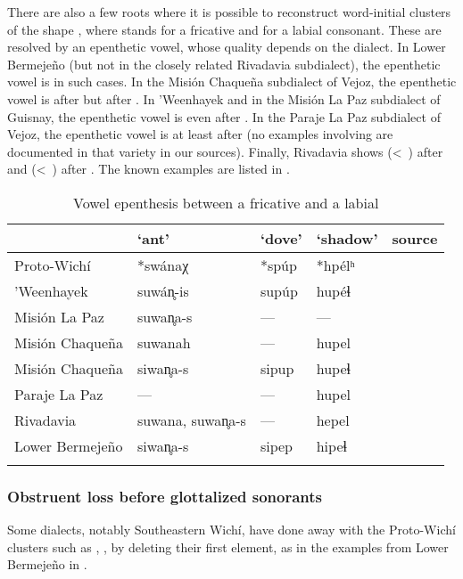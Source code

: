 There are also a few roots where it is possible to reconstruct word-initial clusters of the shape , where  stands for a fricative and  for a labial consonant. These are resolved by an epenthetic vowel, whose quality depends on the dialect. In Lower Bermejeño (but not in the closely related Rivadavia subdialect), the epenthetic vowel is  in such cases. In the Misión Chaqueña subdialect of Vejoz, the epenthetic vowel is  \recind {} after  but  after . In ’Weenhayek and in the Misión La Paz subdialect of Guisnay, the epenthetic vowel is  even after . In the Paraje La Paz subdialect of Vejoz, the epenthetic vowel is  at least after  (no examples involving  are documented in that variety in our sources). Finally, Rivadavia shows  (<~) after  and  (<~) after . The known examples are listed in .

\begin{table}
\caption{Vowel epenthesis between a fricative and a labial}
\label{wi-ep-lab}
 \begin{tabularx}{\textwidth}{llllQ}
  \lsptoprule
            & `ant' & `dove' & `shadow' & source\\\midrule
  Proto-Wichí & *swánaχ & *spúp & *hpélʰ & \\
  ’Weenhayek & suwán̥-is & supúp & hupéɬ & \citet{KC16}\\
  Misión La Paz & suwan̥a-s & — & — & \citet{MA08}\\
  Misión Chaqueña & suwanah & — & hupel & \citet{VU74}\\
  Misión Chaqueña & siwan̥a-s & sipup & hupeɬ & \citet{MG-MELO15}\\
  Paraje La Paz & — & — & hupel & \citet{AFG067}\\
  Rivadavia & suwana, suwan̥a-s & — & hepel & \citet{JT09-th}\\
  Lower Bermejeño & siwan̥a-s & sipep & hipeɬ & \citet{VN14,CS-FL-PR-VN13}\\
  \lspbottomrule
 \end{tabularx}
\end{table}

\subsubsection{Obstruent loss before glottalized sonorants}\label{wi-c'c}

Some dialects, notably Southeastern Wichí, have done away with the Proto-Wichí clusters such as , ,  by deleting their first element, as in the examples from Lower Bermejeño in .


